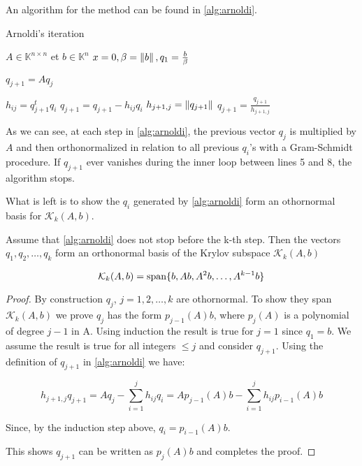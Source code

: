 An algorithm for the method can be found in \ref{alg:arnoldi}.


\begin{algorithm}
    \caption{Arnoldi's iteration}\label{alg:arnoldi}
    \begin{algorithmic}[1]
        \State $A \in \mathbb{K}^{n \times n}$ et $b\in \mathbb{K}^{n}$
        \State $x=0, \beta=\left\lVert b\right\rVert,q_{1}=\frac{b}{\beta}$

        \State $q_{j+1} = Aq_{j}$

        \State $h_{ij}= q_{j+1}^{t}q_{i}$
        \State $q_{j+1} = q_{j+1} - h_{ij}q_{i}$
        \EndFor
        \State $h_{j+1,j}=\left\lVert q_{j+1}\right\rVert$
        \State $q_{j+1} = \frac{q_{j+1}}{h_{j+1,j}}$
        \EndFor

    \end{algorithmic}
\end{algorithm}


As we can see, at each step in \ref{alg:arnoldi}, the previous vector $q_{j}$ is multiplied by $A$ and then orthonormalized in relation to all previous $q_{i}$'s with a Gram-Schmidt procedure. If $q_{j+1}$ ever vanishes during the inner loop between lines 5 and 8, the algorithm stops.

What is left is to show the $q_{i}$ generated by \ref{alg:arnoldi} form an othornormal basis for $\mathcal{K}_{k}(A,b)$.

\begin{proposition}\label{prop:arnoldi_basis}
    Assume that
    \ref{alg:arnoldi} does not stop before the k-th step. Then the vectors $q_{1}, q_{2},
        \dots, q_{k}$ form an orthonormal basis of the Krylov subspace $\mathcal{K}_{k}(A,b)$

    $$
        \mathcal{K}_{k}(A,b) = \operatorname{span} \{b, Ab, A^{2}b, \dots, A^{k-1}b\}
    $$
\end{proposition}

\begin{proof}\label{proof:arnoldi}
    By construction $q_{j}$, $j = 1,2,\dots, k$ are othornormal. To show they span $\mathcal{K}_{k}(A,b)$ we prove $q_{j}$ has the form $p_{j-1}(A)b$, where $p_{j}(A)$ is a polynomial of degree $j-1$ in A.
    Using induction the result is true for $j=1$ since $q_{1} = b$. We assume the result is true for all integers $\leq j$ and consider $q_{j+1}$. Using the definition of $q_{j+1}$ in \ref{alg:arnoldi} we have:

    \begin{equation}
        h_{j+1, j}q_{j+1} = Aq_{j} - \sum_{i=1}^{j} h_{ij}q_{i} = Ap_{j-1}(A)b - \sum_{i=1}^{j} h_{ij}p_{i-1}(A)b
    \end{equation}

    Since, by the induction step above, $q_{i} = p_{i-1}(A)b$.

    This shows $q_{j+1}$ can be written as $p_{j}(A)b$ and completes the proof.
\end{proof}

